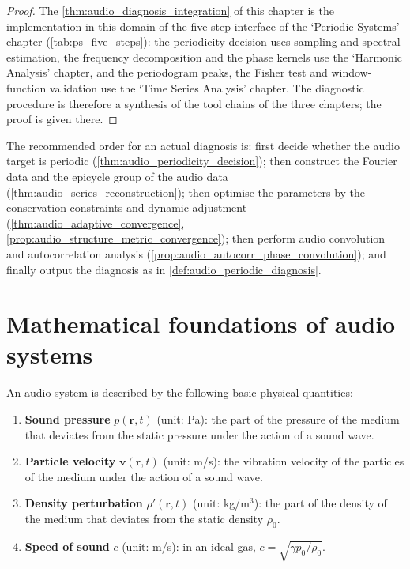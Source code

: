 \begin{proof}
The \cref{thm:audio_diagnosis_integration} of this chapter is the implementation in this domain of the five-step interface of the `Periodic Systems' chapter (\cref{tab:ps_five_steps}):
the periodicity decision uses sampling and spectral estimation, the frequency decomposition and the phase kernels use the `Harmonic Analysis' chapter, and the periodogram peaks, the Fisher test and
window-function validation use the `Time Series Analysis' chapter. The diagnostic procedure is therefore a synthesis of the tool chains of the three chapters; the proof is given there.
\end{proof}

\begin{remark}\label{rem:audio_integration_order}
The recommended order for an actual diagnosis is: first decide whether the audio target is periodic (\cref{thm:audio_periodicity_decision}); then construct the Fourier data and the epicycle group of the audio data (\cref{thm:audio_series_reconstruction}); then optimise the parameters by the conservation constraints and dynamic adjustment (\cref{thm:audio_adaptive_convergence}, \cref{prop:audio_structure_metric_convergence}); then perform audio convolution and autocorrelation analysis (\cref{prop:audio_autocorr_phase_convolution}); and finally output the diagnosis as in \cref{def:audio_periodic_diagnosis}.
\end{remark}

\section{Mathematical foundations of audio systems}

\begin{definition}\label{def:acoustic_quantities}
An audio system is described by the following basic physical quantities:
\begin{enumerate}[label=(\roman*)]
    \item \textbf{Sound pressure} $p(\mathbf{r}, t)$ (unit: Pa): the part of the pressure of the medium that deviates from the static pressure under the action of a sound wave.
    \item \textbf{Particle velocity} $\mathbf{v}(\mathbf{r}, t)$ (unit: m/s): the vibration velocity of the particles of the medium under the action of a sound wave.
    \item \textbf{Density perturbation} $\rho'(\mathbf{r}, t)$ (unit: kg/m$^3$): the part of the density of the medium that deviates from the static density $\rho_0$.
    \item \textbf{Speed of sound} $c$ (unit: m/s): in an ideal gas, $c = \sqrt{\gamma p_0/\rho_0}$.
\end{enumerate}
\end{definition}

